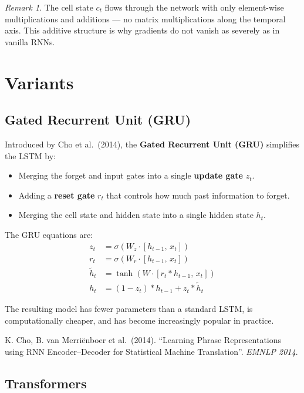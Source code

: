 \documentclass[11pt,a4paper]{article}
\theoremstyle{definition}
\theoremstyle{plain}
\theoremstyle{remark}
\newtheorem*{remark}{Remark}
\begin{document}
\begin{remark}
The cell state $c_t$ flows through the network with only element-wise multiplications and additions --- no matrix multiplications along the temporal axis. This additive structure is why gradients do not vanish as severely as in vanilla RNNs.
\end{remark}


\section{Variants}

\subsection{Gated Recurrent Unit (GRU)}

Introduced by Cho et al.\ (2014), the \textbf{Gated Recurrent Unit (GRU)} simplifies the LSTM by:
\begin{itemize}
    \item Merging the forget and input gates into a single \textbf{update gate} $z_t$.
    \item Adding a \textbf{reset gate} $r_t$ that controls how much past information to forget.
    \item Merging the cell state and hidden state into a single hidden state $h_t$.
\end{itemize}

The GRU equations are:
\begin{align}
    z_t &= \sigma(W_z \cdot [h_{t-1},\, x_t]) \\
    r_t &= \sigma(W_r \cdot [h_{t-1},\, x_t]) \\
    \tilde{h}_t &= \tanh(W \cdot [r_t * h_{t-1},\, x_t]) \\
    h_t &= (1 - z_t) * h_{t-1} + z_t * \tilde{h}_t
\end{align}

The resulting model has fewer parameters than a standard LSTM, is computationally cheaper, and has become increasingly popular in practice.

\begin{tcolorbox}[colback=blue!5!white,colframe=blue!60!black,title={Reference}]
K. Cho, B. van Merri{\"e}nboer et al.\ (2014). ``Learning Phrase Representations using RNN Encoder--Decoder for Statistical Machine Translation''. \textit{EMNLP 2014}.
\end{tcolorbox}

\subsection{Transformers}
\end{document}
